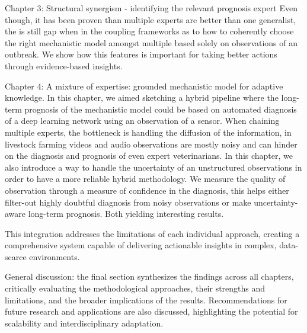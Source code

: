 Chapter 3: Structural synergism - identifying the relevant prognosis expert
Even though, it has been proven than multiple experts are better than one generalist, the is still gap when in the coupling frameworks as to how to coherently choose the right mechanistic model amongst multiple based solely on observations of an outbreak. We show how this features is important for taking better actions through evidence-based insights.  





Chapter 4: A mixture of expertise: grounded mechanistic model for adaptive knowledge. In this chapter, we aimed sketching a hybrid pipeline where the long-term prognosis of the mechanistic model could be based on automated diagnosis of a deep learning network using an observation of a sensor. When chaining multiple experts, the bottleneck is handling the diffusion of the information, in livestock farming videos and audio observations are mostly noisy and can hinder on the diagnosis and prognosis of even expert veterinarians. In this chapter, we also introduce a way to handle the uncertainty of an unstructured observations in order to have a more reliable hybrid methodology. We measure the quality of observation through a measure of confidence in the diagnosis, this helps either filter-out highly doubtful diagnosis from noisy observations or make uncertainty-aware long-term prognosis. Both yielding interesting results.

This integration addresses the limitations of each individual approach, creating a comprehensive system capable of delivering actionable insights in complex, data-scarce environments.

General discussion: the final section synthesizes the findings across all chapters, critically evaluating the methodological approaches, their strengths and limitations, and the broader implications of the results. Recommendations for future research and applications are also discussed, highlighting the potential for scalability and interdisciplinary adaptation.
